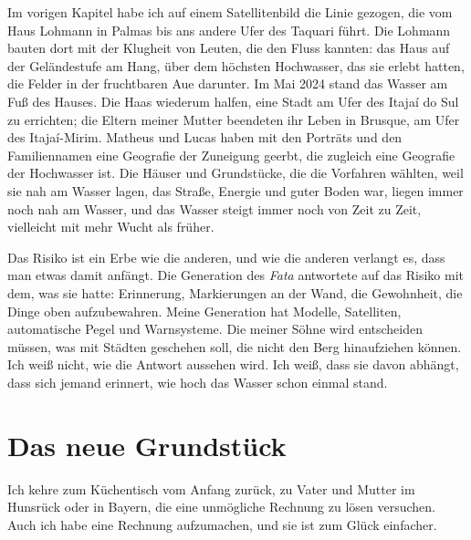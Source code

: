 \documentclass[
  ngerman,
  11pt,
  openany]{book}
\begin{document}
Im vorigen Kapitel habe ich auf einem Satellitenbild die Linie gezogen,
die vom Haus Lohmann in Palmas bis ans andere Ufer des Taquari führt.
Die Lohmann bauten dort mit der Klugheit von Leuten, die den Fluss
kannten: das Haus auf der Geländestufe am Hang, über dem höchsten
Hochwasser, das sie erlebt hatten, die Felder in der fruchtbaren Aue
darunter. Im Mai 2024 stand das Wasser am Fuß des Hauses. Die Haas
wiederum halfen, eine Stadt am Ufer des Itajaí do Sul zu errichten; die
Eltern meiner Mutter beendeten ihr Leben in Brusque, am Ufer des
Itajaí-Mirim. Matheus und Lucas haben mit den Porträts und den
Familiennamen eine Geografie der Zuneigung geerbt, die zugleich eine
Geografie der Hochwasser ist. Die Häuser und Grundstücke, die die
Vorfahren wählten, weil sie nah am Wasser lagen, das Straße, Energie und
guter Boden war, liegen immer noch nah am Wasser, und das Wasser steigt
immer noch von Zeit zu Zeit, vielleicht mit mehr Wucht als früher.

Das Risiko ist ein Erbe wie die anderen, und wie die anderen verlangt
es, dass man etwas damit anfängt. Die Generation des \emph{Fata}
antwortete auf das Risiko mit dem, was sie hatte: Erinnerung,
Markierungen an der Wand, die Gewohnheit, die Dinge oben aufzubewahren.
Meine Generation hat Modelle, Satelliten, automatische Pegel und
Warnsysteme. Die meiner Söhne wird entscheiden müssen, was mit Städten
geschehen soll, die nicht den Berg hinaufziehen können. Ich weiß nicht,
wie die Antwort aussehen wird. Ich weiß, dass sie davon abhängt, dass
sich jemand erinnert, wie hoch das Wasser schon einmal stand.

\section{Das neue Grundstück}\label{das-neue-grundstuxfcck}

Ich kehre zum Küchentisch vom Anfang zurück, zu Vater und Mutter im
Hunsrück oder in Bayern, die eine unmögliche Rechnung zu lösen
versuchen. Auch ich habe eine Rechnung aufzumachen, und sie ist zum
Glück einfacher.
\end{document}
